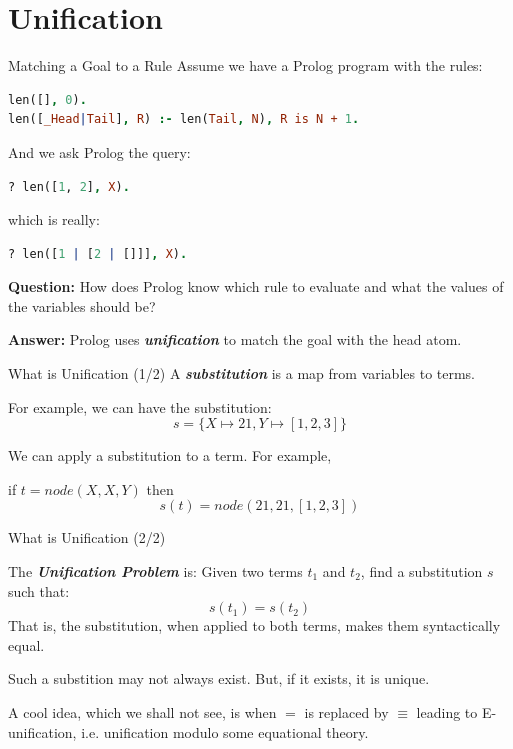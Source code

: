 \section{Unification}

\begin{frame}[fragile]{Matching a Goal to a Rule}
Assume we have a Prolog program with the rules:

\begin{lstlisting}[language=prolog, xleftmargin=0.5cm]
len([], 0).
len([_Head|Tail], R) :- len(Tail, N), R is N + 1.
\end{lstlisting}

\pause 

And we ask Prolog the query:

\begin{lstlisting}[language=prolog, xleftmargin=0.5cm]
? len([1, 2], X).
\end{lstlisting}

which is really: 

\begin{lstlisting}[language=prolog, xleftmargin=0.5cm]
? len([1 | [2 | []]], X).
\end{lstlisting}

\textbf{Question:} How does Prolog know which rule to evaluate and what the
values of the variables should be?

\pause 

\textbf{Answer:} Prolog uses \textbf{\emph{unification}} to match the goal with
the head atom.
\end{frame}   

\begin{frame}{What is Unification (1/2)}
A \textbf{\emph{substitution}} is a map from variables to terms.

\pause

For example, we can have the substitution:
\[
    s = \{ X \mapsto 21, Y \mapsto [1, 2, 3] \} 
\]

\pause

We can apply a substitution to a term. For example, 

if $t = node(X, X, Y)$ then 
\[
    s(t) = node(21, 21, [1, 2, 3])
\]
\end{frame}  

\begin{frame}{What is Unification (2/2)}

The \textbf{\emph{Unification Problem}} is: Given two terms $t_1$ and $t_2$,
find a substitution $s$ such that:
\[
    s(t_1) = s(t_2)
\]
That is, the substitution, when applied to both terms, makes them syntactically equal. 

Such a substition may not always exist. But, if it exists, it is unique.

\medskip

A cool idea, which we shall not see, is when $=$ is replaced by $\equiv$ leading
to E-unification, i.e. unification modulo some equational theory. 
\end{frame}  

